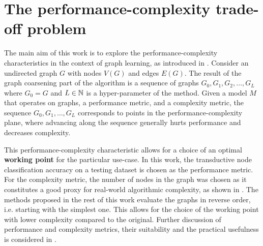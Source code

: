 \section{The performance-complexity trade-off problem}\label{sec:performance-complexity}

The main aim of this work is to explore the performance-complexity characteristics in the context of graph learning, as introduced in \cite{prochazka_downstream_2022}. Consider an undirected graph \( G \) with nodes \( V \left( G \right) \) and edges \( E \left( G \right) \). The result of the graph coarsening part of the algorithm is a sequence of graphs \( G_0, G_1, G_2, \dots, G_L \) where \( G_0 = G \) and \( L \in \mathbb{N} \) is a hyper-parameter of the method.
Given a model \( M \) that operates on graphs, a performance metric, and a complexity metric, the sequence \( G_0, G_1, \dots, G_L \) corresponds to points in the performance-complexity plane, where advancing along the sequence generally hurts performance and decreases complexity.

This performance-complexity characteristic allows for a choice of an optimal \textbf{working point} for the particular use-case. In this work, the transductive node classification accuracy on a testing dataset is chosen as the performance metric. For the complexity metric, the number of nodes in the graph was chosen as it constitutes a good proxy for real-world algorithmic complexity, as shown in \cite{chiang_cluster-gcn_2019}. The methods proposed in the rest of this work evaluate the graphs in reverse order, i.e. starting with the simplest one. This allows for the choice of the working point with lower complexity compared to the original. Further discussion of performance and complexity metrics, their suitability and the practical usefulness is considered in \cite{prochazka_downstream_2022}.
